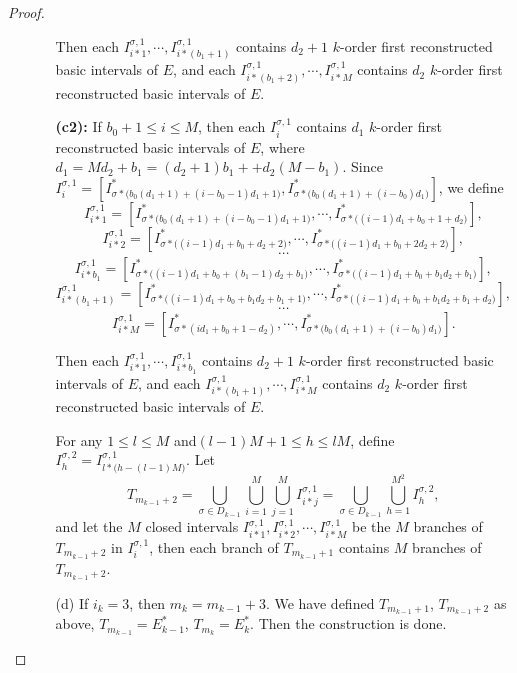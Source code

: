 \documentclass[reqno]{amsart}
\theoremstyle{plain}
\theoremstyle{definition}
\theoremstyle{remark}
\numberwithin{equation}{section} \DeclareMathOperator\intr{int}
\begin{document}
\begin{proof}
\begin{enumerate}
\begin{enumerate}
Then each $I_{i*1}^{\sigma,1}, \cdots, I_{i*(b_1+1)}^{\sigma,1}$ contains $d_2+1$  $k$-order first reconstructed basic intervals of $E$,
and each  $I_{i*(b_1+2)}^{\sigma,1}, \cdots, I_{i*M}^{\sigma,1}$ contains $d_2$  $k$-order first reconstructed basic intervals of $E$.

\textbf{(c2):} If $b_{0}+1\le i\le M$, then
each $I^{\sigma,1}_{i}$ contains $d_1$ $k$-order first reconstructed basic intervals of $E$,
where $d_1=Md_2+b_1=(d_2+1)b_1++d_2(M-b_1)$.
Since $I_{i}^{\sigma,1}=[I^*_{\sigma*\big(b_0(d_1+1)+(i-b_0-1)d_1+1\big)}, I^*_{\sigma*\big(b_0(d_1+1)+(i-b_0)d_1\big)}]$,
we define
$$I_{i*1}^{\sigma,1}=[I^*_{\sigma*\big(b_0(d_1+1)+(i-b_0-1)d_1+1\big)},\cdots,I^*_{\sigma*\big((i-1)d_1+b_0+1+d_2\big)}],$$
$$I_{i*2}^{\sigma,1}=[I^*_{\sigma*\big((i-1)d_1+b_0+d_2+2\big)},\cdots,I^*_{\sigma*\big((i-1)d_1+b_0+2d_2+2\big)}],$$
$$\cdots$$
$$I_{i*b_1}^{\sigma,1}=[I^*_{\sigma*\big((i-1)d_1+b_0+(b_1-1)d_2+b_1\big)},\cdots,I^*_{\sigma*\big((i-1)d_1+b_0+b_1d_2+b_1\big)}],$$
$$I_{i*(b_1+1)}^{\sigma,1}=[I^*_{\sigma*\big((i-1)d_1+b_0+b_1d_2+b_1+1\big)},\cdots,I^*_{\sigma*\big((i-1)d_1+b_0+b_1d_2+b_1+d_2\big)}],$$
$$\cdots$$
$$I_{i*M}^{\sigma,1}=[I^*_{\sigma*(id_1+b_0+1-d_2)},\cdots,I^*_{\sigma*\big(b_0(d_1+1)+(i-b_0)d_1\big)}].$$


Then each $I_{i*1}^{\sigma,1}, \cdots, I_{i*b_1}^{\sigma,1}$ contains $d_2+1$ $k$-order first reconstructed basic intervals of $E$,
and each $I_{i*(b_1+1)}^{\sigma,1}, \cdots, I_{i*M}^{\sigma,1}$ contains $d_2$   $k$-order first reconstructed basic intervals of $E$.

For any $1\le l \le M$ and$(l-1)M+1\le h\le lM$, define $I^{\sigma,2}_{h}=I^{\sigma,1}_{l*\big(h-(l-1)M\big)}$. Let $$T_{m_{k-1}+2}=\bigcup_{\sigma \in D_{k-1}}\bigcup_{i=1}^{M} \bigcup_{j=1}^{M}I^{\sigma,1}_{i*j}=\bigcup_{\sigma \in D_{k-1}}\bigcup_{h=1}^{M^2}I^{\sigma,2}_{h},$$ and let the $M$ closed intervals $I^{\sigma,1}_{i*1},I^{\sigma,1}_{i*2},\cdots, I^{\sigma,1}_{i*M}$  be the $M$ branches of $T_{m_{k-1}+2}$ in $I_{i}^{\sigma,1}$,  then each branch of $T_{m_{k-1}+1}$ contains $M$ branches of $T_{m_{k-1}+2}$.

\item[\textup{(d)}] If $i_{k}=3$, then $m_{k}=m_{k-1}+3$. We have defined $T_{m_{k-1}+1}$, $T_{m_{k-1}+2}$ as above, $T_{m_{k-1}}=E_{k-1}^{*}$, $T_{m_{k}}=E_{k}^{*}$. Then the construction is done.



\end{enumerate}
\end{enumerate}
\end{proof}
\end{document}
